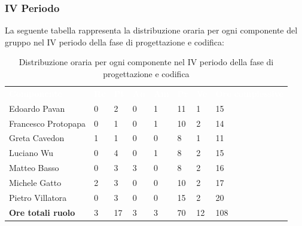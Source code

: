 \subsubsection{IV Periodo}
La seguente tabella rappresenta la distribuzione oraria per ogni componente del gruppo nel IV periodo della fase di progettazione e codifica:
\begin{table}[!htbp]
\begin{center}
\renewcommand{\arraystretch}{1.25}
\begin{tabular}{ m{}<{\centering}  m{}<{\centering} m{}<{\centering} m{}<{\centering}  m{}<{\centering}  m{}<{\centering}  m{}<{\centering}  m{}<{\centering}   }
	\rowcolor{darkblue}
	\textcolor{white}{\textbf{Componente}} &\textcolor{white}{\textbf{Re}}&\textcolor{white}{\textbf{Pt}}&\textcolor{white}{\textbf{An}}&\textcolor{white}{\textbf{Am}}&\textcolor{white}{\textbf{Pr}}&\textcolor{white}{\textbf{Ve}}&\textcolor{white}{\textbf{Ore complessive}}\\ 
	Edoardo Pavan & 0 & 2 & 0 & 1 & 11 & 1 & 15 \\	
	
	Francesco Protopapa & 0 & 1 & 0 & 1 & 10 & 2 & 14 \\

	Greta Cavedon & 1 & 1 & 0 & 0 & 8 & 1 & 11 \\
	
	Luciano Wu & 0 & 4 & 0 & 1 & 8 & 2 & 15 \\
	
	Matteo Basso & 0 & 3 & 3 & 0 & 8 & 2 & 16 \\
	
	Michele Gatto & 2  & 3 & 0 & 0 & 10 & 2 & 17 \\
	
	Pietro Villatora & 0 & 3 & 0 & 0 & 15 & 2 & 20 \\
	
	\textbf{Ore totali ruolo} & 3 & 17 & 3 & 3 & 70 & 12 & 108 \\

\end{tabular}
\caption{Distribuzione oraria per ogni componente nel IV periodo della fase di progettazione e codifica}
\end{center}
\end{table}

